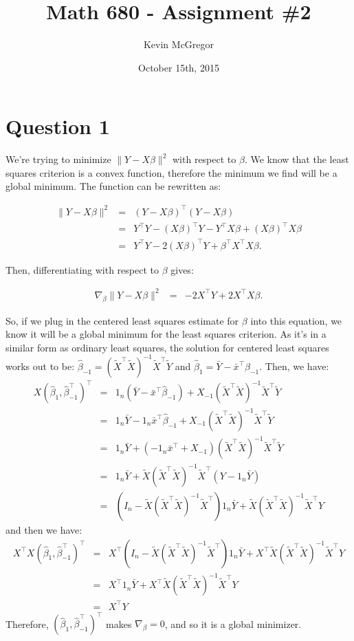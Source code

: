 \documentclass{article}\usepackage[]{graphicx}\usepackage[]{color}
\title{Math 680 - Assignment \#2}
\author{Kevin McGregor}
\date{October 15th, 2015}
\begin{document}
\maketitle

\section*{Question 1}
We're trying to minimize $\|Y-X\beta\|^2$ with respect to $\beta$.  We know that the least squares criterion is a convex function, therefore the minimum we find will be a global minimum.  The function can be rewritten as:

\begin{eqnarray*}
  \|Y-X\beta\|^2 &=& (Y-X\beta)^\top(Y-X\beta) \\
                 &=& Y^\top Y - (X\beta)^\top Y - Y^\top X\beta + (X\beta)^\top X\beta \\
                 &=& Y^\top Y - 2(X\beta)^\top Y + \beta^\top X^\top X\beta.
\end{eqnarray*}

Then, differentiating with respect to $\beta$ gives:

\begin{eqnarray*}
  \nabla_\beta \|Y-X\beta\|^2 &=& -2X^\top Y + 2X^\top X\beta.
\end{eqnarray*}

So, if we plug in the centered least squares estimate for $\beta$ into this equation, we know it will be a global minimum for the least squares criterion. As it's in a similar form as ordinary least squares, the solution for centered least squares works out to be: $\hat{\beta}_{-1}=(\tilde{X}^\top\tilde{X})^{-1}\tilde{X}^\top\tilde{Y}$ and $\hat{\beta}_1=\bar{Y}-\bar{x}^\top\hat{\beta}_{-1}$.  Then, we have:
\begin{eqnarray*}
  X(\hat{\beta}_1, \hat{\beta}_{-1}^\top)^\top &=& 1_n(\bar{Y}-\bar{x}^\top\hat{\beta}_{-1}) + X_{-1}(\tilde{X}^\top\tilde{X})^{-1}\tilde{X}^\top\tilde{Y} \\
    &=& 1_n\bar{Y}-1_n\bar{x}^\top\hat{\beta}_{-1} + X_{-1}(\tilde{X}^\top\tilde{X})^{-1}\tilde{X}^\top\tilde{Y} \\
    &=& 1_n\bar{Y} + (-1_n\bar{x}^\top+X_{-1})(\tilde{X}^\top\tilde{X})^{-1}\tilde{X}^\top\tilde{Y} \\ 
    &=& 1_n\bar{Y} + \tilde{X}(\tilde{X}^\top\tilde{X})^{-1}\tilde{X}^\top(Y-1_n\bar{Y}) \\
    &=& (I_n-\tilde{X}(\tilde{X}^\top\tilde{X})^{-1}\tilde{X}^\top)1_n\bar{Y} + \tilde{X}(\tilde{X}^\top\tilde{X})^{-1}\tilde{X}^\top Y
\end{eqnarray*}
and then we have:
\begin{eqnarray*}
  X^\top X(\hat{\beta}_1, \hat{\beta}_{-1}^\top)^\top &=& X^\top(I_n-\tilde{X}(\tilde{X}^\top\tilde{X})^{-1}\tilde{X}^\top)1_n\bar{Y} + X^\top\tilde{X}(\tilde{X}^\top\tilde{X})^{-1}\tilde{X}^\top Y \\
  &=& X^\top 1_n\bar{Y} + X^\top\tilde{X}(\tilde{X}^\top\tilde{X})^{-1}\tilde{X}^\top Y \\
  &=& X^\top Y
\end{eqnarray*}
Therefore, $(\hat{\beta}_1, \hat{\beta}_{-1}^\top)^\top$ makes $\nabla_\beta=0$, and so it is a global minimizer.
\end{document}
